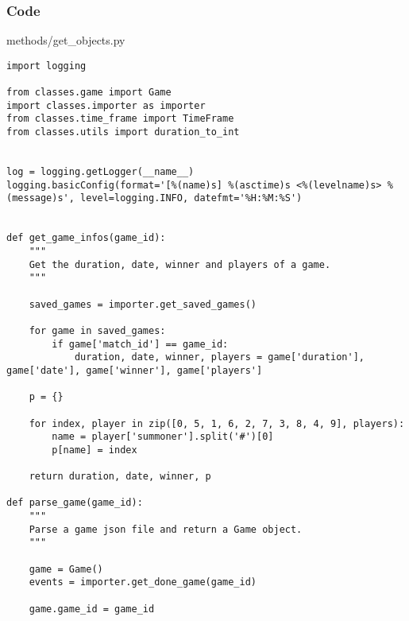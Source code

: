 \documentclass{beamer}
\begin{document}
\begin{frame}[fragile]
    \frametitle{Code}
    \scriptsize
    methods/get\_objects.py \newline
    \fontsize{3pt}{5pt}\selectfont
    \begin{verbatim}
import logging

from classes.game import Game
import classes.importer as importer
from classes.time_frame import TimeFrame
from classes.utils import duration_to_int


log = logging.getLogger(__name__)
logging.basicConfig(format='[%(name)s] %(asctime)s <%(levelname)s> %(message)s', level=logging.INFO, datefmt='%H:%M:%S')


def get_game_infos(game_id):
    """
    Get the duration, date, winner and players of a game.
    """
    
    saved_games = importer.get_saved_games()

    for game in saved_games:
        if game['match_id'] == game_id:
            duration, date, winner, players = game['duration'], game['date'], game['winner'], game['players']

    p = {}

    for index, player in zip([0, 5, 1, 6, 2, 7, 3, 8, 4, 9], players):
        name = player['summoner'].split('#')[0]
        p[name] = index

    return duration, date, winner, p

def parse_game(game_id):
    """
    Parse a game json file and return a Game object.
    """
    
    game = Game()
    events = importer.get_done_game(game_id)

    game.game_id = game_id
    \end{verbatim}
\end{frame}
\end{document}
